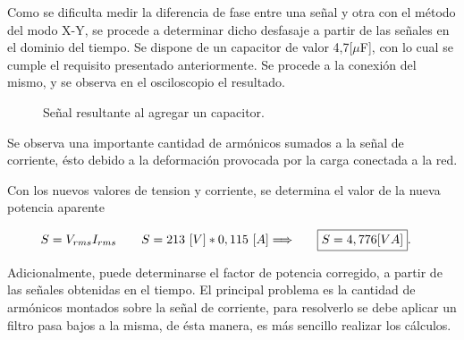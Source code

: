           Como se dificulta medir la diferencia de fase entre una señal y otra con el método del modo X-Y,
          se procede a determinar dicho desfasaje a partir de las señales en el dominio del tiempo. 
          Se dispone de un capacitor de valor 4,7[$\mu$F], con lo cual se cumple el requisito presentado
          anteriormente. Se procede a la conexión del mismo, y se observa en el osciloscopio el resultado.
        
        \begin{figure}[H]
          \centering
          \caption{Señal resultante al agregar un capacitor.}
          \label{fig: Señal_Correccion}
        \end{figure}

        Se observa una importante cantidad de armónicos sumados a la señal de corriente, ésto debido
        a la deformación provocada por la carga conectada a la red.

         Con los nuevos valores de tension y corriente, se determina el valor de la nueva potencia 
         aparente

        \begin{align*}
          S = V_{rms}I_{rms}  \hspace{20pt} S=213\ [V]*0,115\ [A] \Longrightarrow \hspace{20pt} \Aboxed{S = 4,776 [VA]}.
        \end{align*}

          Adicionalmente, puede determinarse el factor de potencia corregido, a partir de las señales
          obtenidas en el tiempo. El principal problema es la cantidad de armónicos montados sobre 
          la señal de corriente, para resolverlo se debe aplicar un filtro pasa bajos a la misma, de
         ésta manera, es más sencillo realizar los cálculos.

